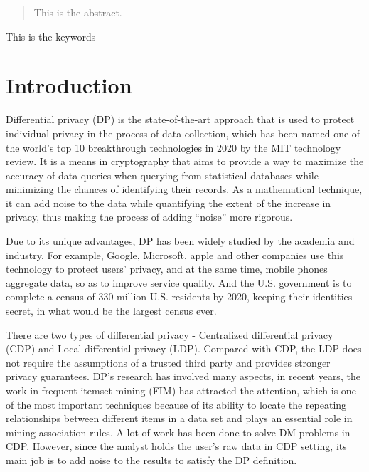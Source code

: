 \documentclass[conference]{IEEEtran}
\begin{document}
\begin{abstract}
This is the abstract.
\end{abstract}

\begin{IEEEkeywords}
This is the keywords
\end{IEEEkeywords}

\section{Introduction}
Differential privacy (DP)\cite{a7} is the state-of-the-art approach that is used to protect individual privacy in the process of data collection, which has been named one of the world's top 10 breakthrough technologies in 2020 by the MIT technology review. It is a means in cryptography that aims to provide a way to maximize the accuracy of data queries when querying from statistical databases while minimizing the chances of identifying their records. As a mathematical technique, it can add noise to the data while quantifying the extent of the increase in privacy, thus making the process of adding ``noise'' more rigorous.

Due to its unique advantages, DP has been widely studied by the academia and industry. For example, Google, Microsoft, apple and other companies use this technology to protect users' privacy, and at the same time, mobile phones aggregate data, so as to improve service quality. And the U.S. government is to complete a census of 330 million U.S. residents by 2020, keeping their identities secret, in what would be the largest census ever.

There are two types of differential privacy - Centralized differential privacy (CDP) and Local differential privacy (LDP). Compared with CDP, the LDP does not require the assumptions of a trusted third party and provides stronger privacy guarantees.  {\color{red}DP's research has involved many aspects, in recent years, the work in frequent itemset mining (FIM) has attracted the attention, which is one of  the most important techniques because of its ability to locate the repeating relationships between different items in a data set and plays an essential role in mining association rules\cite{apriori}. A lot of work\cite{a3,a4,a5,a6} has been done to solve DM problems in CDP. However, since the analyst holds the user's raw data in CDP setting, its main job is to add noise to the results to satisfy the DP definition.}
\end{document}
